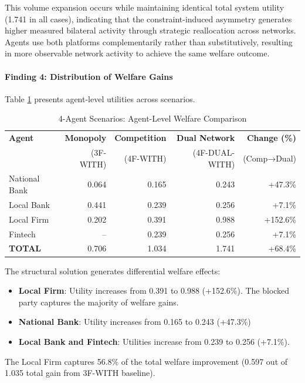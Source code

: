 This volume expansion occurs while maintaining identical total system utility (1.741 in all cases), indicating that the constraint-induced asymmetry generates higher measured bilateral activity through strategic reallocation across networks. Agents use both platforms complementarily rather than substitutively, resulting in more observable network activity to achieve the same welfare outcome.


\paragraph{Finding 4: Distribution of Welfare Gains}

Table \ref{tab:4f_dual_welfare_comparison} presents agent-level utilities across scenarios.

\begin{table}[h]
\centering
\caption{4-Agent Scenarios: Agent-Level Welfare Comparison}
\label{tab:4f_dual_welfare_comparison}
\begin{tabular}{lrrrr}
\hline
\textbf{Agent} & \textbf{Monopoly} & \textbf{Competition} & \textbf{Dual Network} & \textbf{Change (\%)} \\ 
 & (3F-WITH) & (4F-WITH) & (4F-DUAL-WITH) & (Comp→Dual) \\ \hline
National Bank & 0.064 & 0.165 & 0.243 & +47.3\% \\
Local Bank & 0.441 & 0.239 & 0.256 & +7.1\% \\
Local Firm & 0.202 & 0.391 & 0.988 & +152.6\% \\
Fintech & -- & 0.239 & 0.256 & +7.1\% \\
\hline
\textbf{TOTAL} & 0.706 & 1.034 & 1.741 & +68.4\% \\
\hline
\end{tabular}
\end{table}

The structural solution generates differential welfare effects:
\begin{itemize}
    \item \textbf{Local Firm}: Utility increases from 0.391 to 0.988 (+152.6\%). The blocked party captures the majority of welfare gains.
    \item \textbf{National Bank}: Utility increases from 0.165 to 0.243 (+47.3\%)
    \item \textbf{Local Bank and Fintech}: Utilities increase from 0.239 to 0.256 (+7.1\%). 
\end{itemize}

The Local Firm captures 56.8\% of the total welfare improvement (0.597 out of 1.035 total gain from 3F-WITH baseline).

